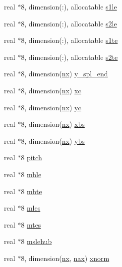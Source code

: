 \begin{DoxyCompactItemize}
\item 
real $\ast$8, dimension(\+:), allocatable \hyperlink{namespaceglobvar_a017229d1a37091ea8dac7e17f605f980}{s1le}
\item 
real $\ast$8, dimension(\+:), allocatable \hyperlink{namespaceglobvar_a56cea75eae9b813c72f7b81943739f7a}{s2le}
\item 
real $\ast$8, dimension(\+:), allocatable \hyperlink{namespaceglobvar_a2c17a89a6df336f0e78a4ec060a7af98}{s1te}
\item 
real $\ast$8, dimension(\+:), allocatable \hyperlink{namespaceglobvar_aecd5a79b6e1e9b517f57dcd7a03a513c}{s2te}
\item 
real $\ast$8, dimension(\hyperlink{namespaceglobvar_ae4d2e4d1bd4180999afe29337165e1e6}{nx}) \hyperlink{namespaceglobvar_a5512ca98f844211a8ecb85b0be7168cc}{y\+\_\+spl\+\_\+end}
\item 
real $\ast$8, dimension(\hyperlink{namespaceglobvar_ae4d2e4d1bd4180999afe29337165e1e6}{nx}) \hyperlink{namespaceglobvar_a69b897237929c1e1095f61f9da69c152}{xc}
\item 
real $\ast$8, dimension(\hyperlink{namespaceglobvar_ae4d2e4d1bd4180999afe29337165e1e6}{nx}) \hyperlink{namespaceglobvar_aa12e45433bb052d282ad478af9f88e3a}{yc}
\item 
real $\ast$8, dimension(\hyperlink{namespaceglobvar_ae4d2e4d1bd4180999afe29337165e1e6}{nx}) \hyperlink{namespaceglobvar_a9ae5763e77ebfcbe371431bd4f1eeb7e}{xbs}
\item 
real $\ast$8, dimension(\hyperlink{namespaceglobvar_ae4d2e4d1bd4180999afe29337165e1e6}{nx}) \hyperlink{namespaceglobvar_aabf35f2f56582d00668fde51696a4701}{ybs}
\item 
real $\ast$8 \hyperlink{namespaceglobvar_ae18c6278744d9db850158672b4cbd5ea}{pitch}
\item 
real $\ast$8 \hyperlink{namespaceglobvar_a60e1f3c0590fe494deaaa98bde27c96f}{mble}
\item 
real $\ast$8 \hyperlink{namespaceglobvar_a9f55e62c22dc5aef4a6167ef140b95d4}{mbte}
\item 
real $\ast$8 \hyperlink{namespaceglobvar_aadf047ab1c784bfc190712db2f3d8500}{mles}
\item 
real $\ast$8 \hyperlink{namespaceglobvar_abca0ebe31fa026de505bf14e3b3555ec}{mtes}
\item 
real $\ast$8 \hyperlink{namespaceglobvar_a077a5c5d840711646184a5e2f499a2d3}{mslehub}
\item 
real $\ast$8, dimension(\hyperlink{namespaceglobvar_ae4d2e4d1bd4180999afe29337165e1e6}{nx}, \hyperlink{namespaceglobvar_acff3033374e6d73d14fb06fc53fc205c}{nax}) \hyperlink{namespaceglobvar_ab440a94bbb0e22d41835056ae7c0ec08}{xnorm}

\end{DoxyCompactItemize}
